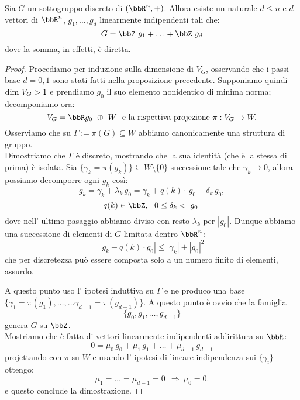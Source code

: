 \begin{teorema}Sia $G$ un sottogruppo discreto di $(\bbR^n,+)$. Allora esiste un naturale $d\leq n$ e $d$ vettori di $\bbR^n$, $g_1,\ldots,g_d$ linearmente indipendenti tali che:
$$
G=\bbZ\ g_1+\ldots+\bbZ\ g_d
$$
dove la somma, in effetti, è diretta.
\end{teorema}
\begin{proof}
Procediamo per induzione sulla dimensione di $V_G$, osservando che i passi base $d=0,1$ sono stati fatti nella proposizione precedente. Supponiamo quindi $\text{dim }{V_G}>1$ e prendiamo $g_0$ il suo elemento nonidentico di minima norma; decomponiamo ora:
$$
V_G=\bbR g_0\ \oplus\  W\ \mbox{ e la rispettiva projezione}\ \pi:V_G\rightarrow W.
$$
Osserviamo che su $\Gamma:=\pi(G)\subseteq W$ abbiamo canonicamente una struttura di gruppo.\\
Dimostriamo che $\Gamma$ è discreto, mostrando che la sua identità (che è la stessa di prima) è isolata. Sia $\{\gamma_k=\pi(g_k)\}\subseteq W\setminus\{0\}$ successione tale che $\gamma_k\rightarrow 0$, allora possiamo decomporre ogni $g_k$ così:
$$
g_k=\gamma_k+\lambda_k\, g_0=\gamma_k+q(k)\cdot\, g_0+\delta_k\, g_0,
$$
$$
q(k)\in\bbZ,\ \ 0\leq \delta_k<|g_0|
$$
dove nell' ultimo pasaggio abbiamo diviso con resto $\lambda_k$ per $|g_0|$. Dunque abbiamo una successione di elementi di $G$ limitata dentro $\bbR^n$:
$$
|g_k-q(k)\cdot g_0|\leq|\gamma_k|+|g_0|^2
$$
che per discretezza può essere composta solo a un numero finito di elementi, assurdo.

A questo punto uso l' ipotesi induttiva su $\Gamma$ e ne produco una base $\{\gamma_1=\pi(g_1),\ldots,\ldots \gamma_{d-1}=\pi(g_{d-1})\}$. A questo punto è ovvio che la famiglia
$$
\{g_0,g_1,\ldots,g_{d-1}\}
$$ 
genera $G$ su $\bbZ$.\\
Mostriamo che è fatta di vettori linearmente indipendenti addirittura su $\bbR$:
$$
0=\mu_0\, g_0+\mu_1\, g_1+\ldots+\mu_{d-1}\, g_{d-1}
$$
projettando con $\pi$ su $W$ e usando l' ipotesi di lineare indipendenza sui $\{\gamma_i\}$ ottengo:
$$
\mu_1=\ldots=\mu_{d-1}=0\ \ \Rightarrow\  \mu_0=0.
$$
e questo conclude la dimostrazione.
\end{proof}


